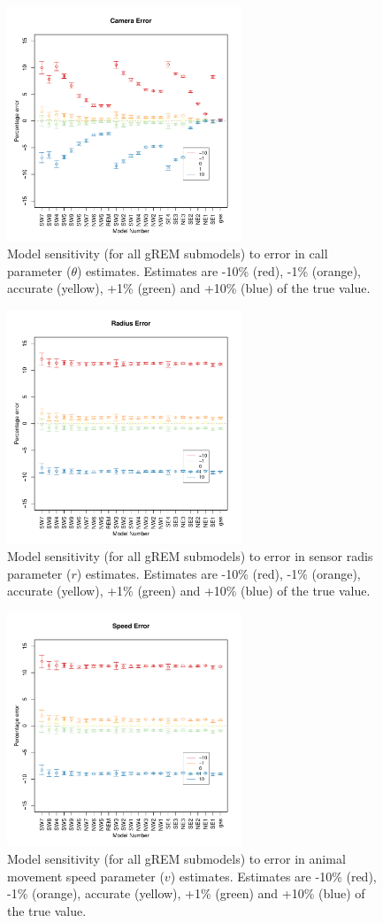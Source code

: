 \documentclass[a4paper,10pt,reqno,oneside]{amsart}
\begin{document}
\begin{figure}[h!]
	\includegraphics[width=7cm]{imgs/AverageModelBias_cameraerror.pdf}
	\caption{Model sensitivity (for all gREM submodels) to error in call parameter ($\theta$) estimates. Estimates are -10\% (red), -1\% (orange), accurate (yellow), +1\% (green) and +10\% (blue) of the true value. } 
	\label{f:sensCallError}
\end{figure}


\begin{figure}[h!]
	\includegraphics[width=7cm]{imgs/AverageModelBias_radiuserror.pdf}
	\caption{Model sensitivity (for all gREM submodels) to error in sensor radis parameter ($r$) estimates. Estimates are -10\% (red), -1\% (orange), accurate (yellow), +1\% (green) and +10\% (blue) of the true value. } 
	\label{f:sensCallError}
\end{figure}


\begin{figure}[h!]
	\includegraphics[width=7cm]{imgs/AverageModelBias_speederror.pdf}
	\caption{Model sensitivity (for all gREM submodels) to error in animal movement speed parameter ($v$) estimates. Estimates are -10\% (red), -1\% (orange), accurate (yellow), +1\% (green) and +10\% (blue) of the true value. } 
	\label{f:sensCallError}
\end{figure}
\end{document}
